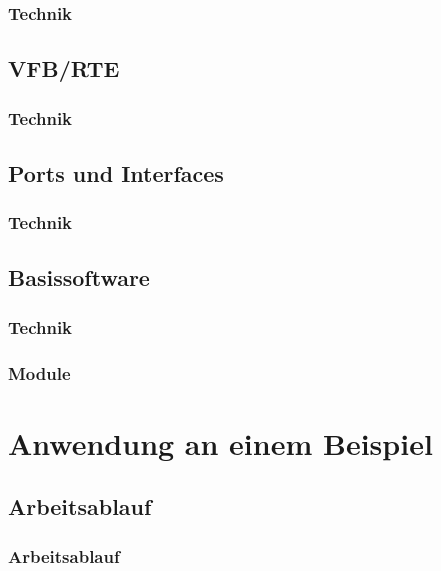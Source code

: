 \documentclass[]{beamer}
\begin{document}
\begin{frame}
\frametitle{Technik}

\end{frame}

\subsection{VFB/RTE}
\label{sec:VFB_RTE}
\begin{frame}
\frametitle{Technik}

\end{frame}

\subsection{Ports und Interfaces}
\label{sec:ports_interfaces}
\begin{frame}
\frametitle{Technik}

\end{frame}

\subsection{Basissoftware}
\label{sec:bsw}
\begin{frame}
\frametitle{Technik}

\end{frame}

\begin{frame}
\frametitle{Module}

\end{frame}





\section{Anwendung an einem Beispiel}
\label{sec:anwendung_beispiel}

\subsection{Arbeitsablauf}
\label{sec:arbeitsablauf}

\begin{frame}
\frametitle{Arbeitsablauf}

\end{frame}
\end{document}

